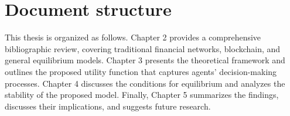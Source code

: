 \section{Document structure}
This thesis is organized as follows. Chapter 2 provides a comprehensive bibliographic review, covering traditional financial networks, blockchain, and general equilibrium models. Chapter 3 presents the theoretical framework and outlines the proposed utility function that captures agents' decision-making processes. Chapter 4 discusses the conditions for equilibrium and analyzes the stability of the proposed model. Finally, Chapter 5 summarizes the findings, discusses their implications, and suggests  future research.

